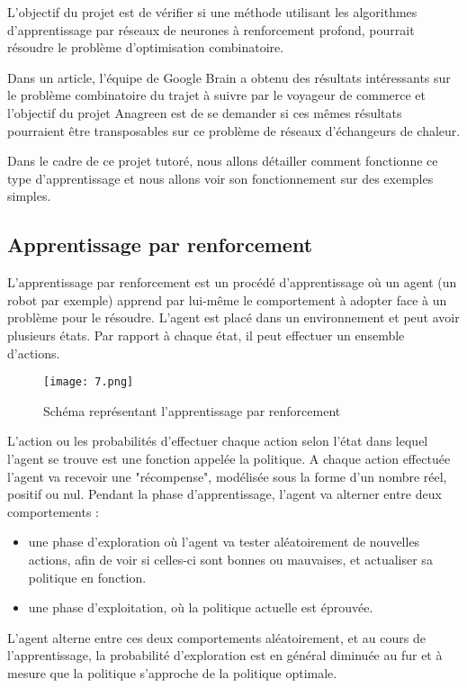L'objectif du projet est de vérifier si une méthode utilisant les algorithmes d'apprentissage par réseaux de neurones à renforcement profond, pourrait résoudre le problème d'optimisation combinatoire.

Dans un article, l'équipe de Google Brain \cite{google} a obtenu des résultats intéressants sur le problème combinatoire du trajet à suivre par le voyageur de commerce et l'objectif du projet Anagreen est de se demander si ces mêmes résultats pourraient être transposables sur ce problème de réseaux d'échangeurs de chaleur. 

Dans le cadre de ce projet tutoré, nous allons détailler comment fonctionne ce type d'apprentissage et nous allons voir son fonctionnement sur des exemples simples.


\subsection{Apprentissage par renforcement}

L'apprentissage par renforcement est un procédé d'apprentissage où un agent (un robot par exemple) apprend par lui-même le comportement à adopter face à un problème pour le résoudre. L'agent est placé dans un environnement et peut avoir plusieurs états. Par rapport à chaque état, il peut effectuer un ensemble d'actions. 

\begin{figure}[!h]
\centering
\texttt{[image: 7.png]}
\caption{Schéma représentant l'apprentissage par renforcement}
\label{renf}
\end{figure}

L'action ou les probabilités d'effectuer chaque action selon l'état dans lequel l'agent se trouve est une fonction appelée la politique. 
A chaque action effectuée l'agent va recevoir une "récompense", modélisée sous la forme d'un nombre réel, positif ou nul. Pendant la phase d'apprentissage, l'agent va alterner entre deux comportements :

\begin{itemize}
\item une phase d'exploration où l'agent va tester aléatoirement de nouvelles actions, afin de voir si celles-ci sont bonnes ou mauvaises, et actualiser sa politique en fonction.
\item une phase d'exploitation, où la politique actuelle est éprouvée.
\end{itemize}

L'agent alterne entre ces deux comportements aléatoirement, et au cours de l'apprentissage, la probabilité d'exploration est en général diminuée au fur et à mesure que la politique s'approche de la politique optimale.


